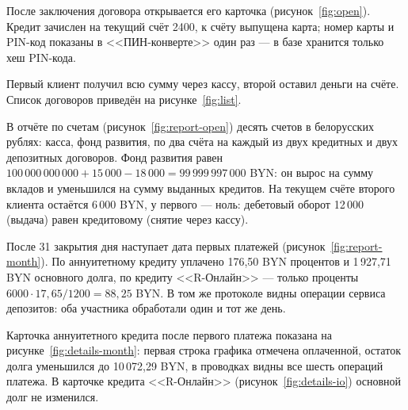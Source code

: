 \documentclass[14pt,a4paper]{extarticle}
\begin{document}


После заключения договора открывается его карточка (рисунок~\ref{fig:open}). Кредит
зачислен на текущий счёт 2400, к счёту выпущена карта; номер карты и PIN-код показаны в
<<ПИН-конверте>> один раз --- в базе хранится только хеш PIN-кода.


Первый клиент получил всю сумму через кассу, второй оставил деньги на счёте. Список
договоров приведён на рисунке~\ref{fig:list}.


В отчёте по счетам (рисунок~\ref{fig:report-open}) десять счетов в белорусских рублях:
касса, фонд развития, по два счёта на каждый из двух кредитных и двух депозитных договоров.
Фонд развития равен $100\,000\,000\,000 + 15\,000 - 18\,000 = 99\,999\,997\,000$ BYN: он
вырос на сумму вкладов и уменьшился на сумму выданных кредитов. На текущем счёте второго
клиента остаётся 6\,000 BYN, у первого --- ноль: дебетовый оборот 12\,000 (выдача) равен
кредитовому (снятие через кассу).


После 31 закрытия дня наступает дата первых платежей (рисунок~\ref{fig:report-month}).
По аннуитетному кредиту уплачено 176,50 BYN процентов и 1\,927,71 BYN основного долга, по
кредиту <<R-Онлайн>> --- только проценты $6000 \cdot 17{,}65 / 1200 = 88{,}25$ BYN. В том же
протоколе видны операции сервиса депозитов: оба участника обработали один и тот же день.


Карточка аннуитетного кредита после первого платежа показана на
рисунке~\ref{fig:details-month}: первая строка графика отмечена оплаченной, остаток долга
уменьшился до 10\,072,29 BYN, в проводках видны все шесть операций платежа. В карточке
кредита <<R-Онлайн>> (рисунок~\ref{fig:details-io}) основной долг не изменился.

\end{document}
